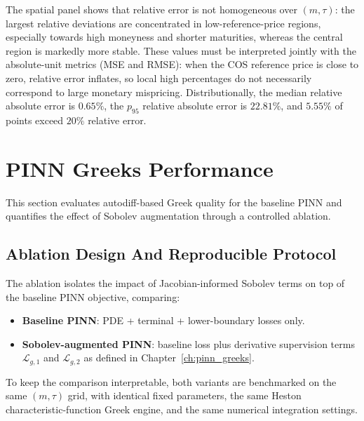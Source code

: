 The spatial panel shows that relative error is not homogeneous over \((m,\tau)\): the largest relative deviations are concentrated in low-reference-price regions, especially towards high moneyness and shorter maturities, whereas the central region is markedly more stable. These values must be interpreted jointly with the absolute-unit metrics (MSE and RMSE): when the COS reference price is close to zero, relative error inflates, so local high percentages do not necessarily correspond to large monetary mispricing. Distributionally, the median relative absolute error is \(0.65\%\), the \(p_{95}\) relative absolute error is \(22.81\%\), and \(5.55\%\) of points exceed \(20\%\) relative error.

\section{PINN Greeks Performance}
\label{sec:pinn_greeks_performance}
This section evaluates autodiff-based Greek quality for the baseline PINN and quantifies the effect of Sobolev augmentation through a controlled ablation.

\subsection{Ablation Design And Reproducible Protocol}
\label{sec:ablation_pinn_sobolev}
The ablation isolates the impact of Jacobian-informed Sobolev terms on top of the baseline PINN objective, comparing:
\begin{itemize}
    \item \textbf{Baseline PINN}: PDE + terminal + lower-boundary losses only.
    \item \textbf{Sobolev-augmented PINN}: baseline loss plus derivative supervision terms \(\mathcal{L}_{g,1}\) and \(\mathcal{L}_{g,2}\) as defined in Chapter~\ref{ch:pinn_greeks}.
\end{itemize}

To keep the comparison interpretable, both variants are benchmarked on the same \((m,\tau)\) grid, with identical fixed parameters, the same Heston characteristic-function Greek engine, and the same numerical integration settings.

